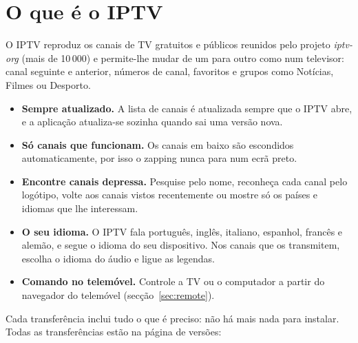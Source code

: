 \newcommand{\GuideLang}{portuguese}
\newcommand{\GuideTitle}{Guia de início rápido}
\newcommand{\TipLabel}{Dica.}




\section{O que é o IPTV}

O IPTV reproduz os canais de TV gratuitos e públicos reunidos pelo projeto
\emph{iptv-org} (mais de 10\,000) e permite-lhe mudar de um para outro como
num televisor: canal seguinte e anterior, números de canal, favoritos e
grupos como Notícias, Filmes ou Desporto.

\begin{itemize}
  \item \textbf{Sempre atualizado.} A lista de canais é atualizada sempre que
        o IPTV abre, e a aplicação atualiza-se sozinha quando sai uma versão
        nova.
  \item \textbf{Só canais que funcionam.} Os canais em baixo são escondidos
        automaticamente, por isso o zapping nunca para num ecrã preto.
  \item \textbf{Encontre canais depressa.} Pesquise pelo nome, reconheça cada
        canal pelo logótipo, volte aos canais vistos recentemente ou mostre
        só os países e idiomas que lhe interessam.
  \item \textbf{O seu idioma.} O IPTV fala português, inglês, italiano,
        espanhol, francês e alemão, e segue o idioma do seu dispositivo. Nos
        canais que os transmitem, escolha o idioma do áudio e ligue as
        legendas.
  \item \textbf{Comando no telemóvel.} Controle a TV ou o computador a partir
        do navegador do telemóvel (secção~\ref{sec:remote}).
\end{itemize}

Cada transferência inclui tudo o que é preciso: não há mais nada para
instalar. Todas as transferências estão na página de versões:

\begin{center}
  \download
\end{center}

